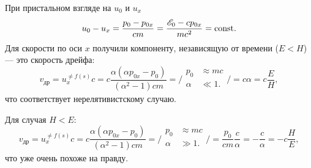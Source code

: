 При пристальном взгляде на $u_0$ и $u_x$ 
\begin{equation*}
	u_0 - u_x = \frac{p_0 - p_{0x}}{cm} = 
	\frac{\mathscr{E}_0 - c p_{0x}}{m c^2}
	=
	\text{const}.
\end{equation*}
Для скорости по оси $x$ получили компоненту, независящую от времени ($E < H$) --- это скорость дрейфа:
\begin{equation*}
	v_{\text{др}} = u_x^{\neq f(s)} c  = c
	\frac{\alpha  (\alpha  p_{0x}-p_0)}{\left(\alpha ^2-1\right) c m} = 
	\bigg/
	\begin{aligned}
	    p_0 &\approx m c\\
	    \alpha &\ll 1. \\
	\end{aligned}
	\bigg/ = c \alpha = c \frac{E}{H},
\end{equation*}
что соответствует нерелятивистскому случаю.

Для случая $H < E$:
\begin{equation*}
	v_{\text{др}} = u_x^{\neq f(s)} c  = c
	\frac{\alpha  (\alpha  p_{0x}-p_0)}{\left(\alpha ^2-1\right) c m} = 
	\bigg/
	\begin{aligned}
	    p_0 &\approx m c\\
	    \alpha &\gg 1. \\
	\end{aligned}
	\bigg/ = \frac{p_0}{cm} \frac{c}{\alpha} = 
	 -\frac{c}{\alpha} = -c \frac{H}{E},
\end{equation*}
что уже очень похоже на правду.